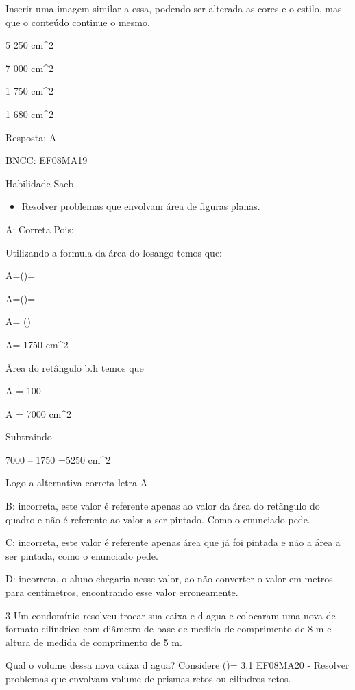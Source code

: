 Inserir uma imagem similar a essa, podendo ser alterada as cores e o
estilo, mas que o conteúdo continue o mesmo.

\item 5 250 cm^2
\item 7 000 cm^2
\item 1 750 cm^2
\item 1 680 cm^2

Resposta: A

BNCC: EF08MA19

Habilidade Saeb

\begin{itemize}
\tightlist

\item 
  Resolver problemas que envolvam área de figuras planas.
\end{itemize}

A: Correta Pois:

Utilizando a formula da área do losango temos que:

A=()=

A=()=

A= ()

A= 1750 cm^2

Área do retângulo b.h temos que

A = 100

A = 7000 cm^2

Subtraindo

7000 -- 1750 =5250 cm^2

Logo a alternativa correta letra A

B: incorreta, este valor é referente apenas ao valor da área do
retângulo do quadro e não é referente ao valor a ser pintado. Como o
enunciado pede.

C: incorreta, este valor é referente apenas área que já foi pintada e
não a área a ser pintada, como o enunciado pede.

D: incorreta, o aluno chegaria nesse valor, ao não converter o valor em
metros para centímetros, encontrando esse valor erroneamente.

\num{3} Um condomínio resolveu trocar sua caixa e d agua e colocaram uma nova
de formato cilíndrico com diâmetro de base de medida de comprimento de 8
m e altura de medida de comprimento de 5 m.

Qual o volume dessa nova caixa d agua? Considere ()= 3,1
EF08MA20 - Resolver problemas que envolvam volume de prismas retos ou
cilindros retos.

